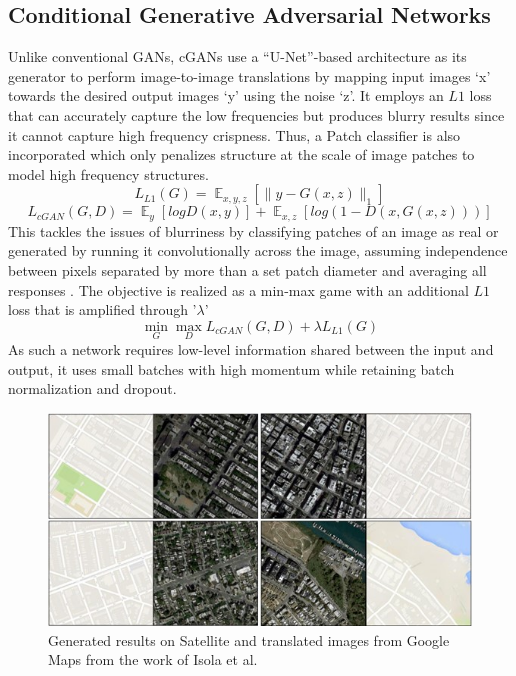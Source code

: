 \documentclass{Configuration_Files/PoliMi3i_thesis}
\begin{document}
\subsection{Conditional Generative Adversarial Networks}
Unlike conventional GANs, cGANs use a “U-Net”-based architecture as its generator to 
perform image-to-image translations by mapping input images ‘x’ towards the 
desired output images ‘y’ using the noise ‘z’. 
It employs an $L1$ loss that can accurately capture the low frequencies but produces 
blurry results since it cannot capture high frequency 
crispness. Thus, a Patch classifier is also incorporated which only penalizes 
structure at the scale of image patches to model high frequency structures. 
\begin{equation} \label{eq:l1loss}
L_{L1}(G) =  \mathop{{}\mathbb{E}}_{x,y,z}[\|y-G(x,z)\|_{1}]
\end{equation}
\begin{equation} \label{eq:patchloss}
L_{cGAN}(G,D) =  \mathop{{}\mathbb{E}}_{y}[logD(x,y)] +  \mathop{{}\mathbb{E}}_{x,z}[log(1-D(x,G(x,z)))]
\end{equation}
This tackles the issues of blurriness by classifying patches of an image as real or generated by running it 
convolutionally across the image, assuming independence between pixels separated 
by more than a set patch diameter and averaging all responses \cite{PhI17}. The objective is
realized as a min-max game with an additional $L1$ loss that is amplified through '$\lambda$'
\begin{equation} \label{eq:cganminmax}
\min_{G}\max_{D}L_{cGAN}(G,D)+\lambda L_{L1}(G)
\end{equation}
As such a network 
requires low-level information shared between the input and output, it uses small 
batches with high momentum while retaining batch normalization and dropout. 
\begin{figure}[H]
    \centering
    \includegraphics[width=1\textwidth]{cgan_results.jpg}
    \caption[Generated Google Maps images from the work of Isola et al.]{Generated results on Satellite and translated images from Google Maps from the work of Isola et al.}
    \label{fig:cganresults}
\end{figure}
\end{document}
